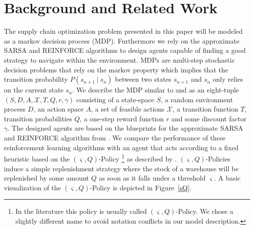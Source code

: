 \documentclass[journal, a4paper]{IEEEtran}
\newcommand{\argmax}{\operatornamewithlimits{argmax}}
\newcommand{\x}{\mathbf{x}}
\newcommand{\y}{\mathbf{y}}
\newcommand{\ypred}{\mathbf{\hat y}}
\theoremstyle{plain}
\theoremstyle{definition}
\begin{document}
\section{Background and Related Work}
The supply chain optimization problem presented in this paper will be modeled as a markov decision process (MDP). Furthermore we rely on the approximate SARSA and REINFORCE algorithms to design agents capable of finding a good strategy to navigate within the environment. \newline
MDPs are multi-step stochastic decision problems that rely on the markov property which implies that the transition probability $P(s_{n+1} \ | \  s_n)$ between two states $s_{n+1}$ and $s_n$ only relies on the current state $s_n$. We describe the MDP similar to \cite{Moritz} and \cite{PowellADP} as an eight-tuple $(S, D, A, \mathcal{X}, T, Q, r, \gamma)$ consisting of a state-space $S$, a random environment process $D$, an action space $A$, a set of feasible actions $\mathcal{X}$, a transition function $T$, transition probabilities $Q$, a one-step reward function $r$ and some discount factor $\gamma$. \newline
The designed agents are based on the blueprints for the approximate SARSA and REINFORCE algorithm from \cite{LectureDRL}. We compare the performance of these reinforcement learning algorithms with an agent that acts according to a fixed heuristic based on the $(\varsigma, Q)$-Policy \footnote{In the literature this policy is usually called $(\varsigma, Q)$-Policy. We chose a slightly different name to avoid notation conflicts in our model description.} as described by \cite{sQ}. $(\varsigma, Q)$-Policies induce a simple replenishment strategy where the stock of a warehouse will be replenished by some amount $Q$ as soon as it falls under a threshold $\varsigma$. A basic visualization of the $(\varsigma, Q)$-Policy is depicted in Figure~\ref{sQ}.
\end{document}
